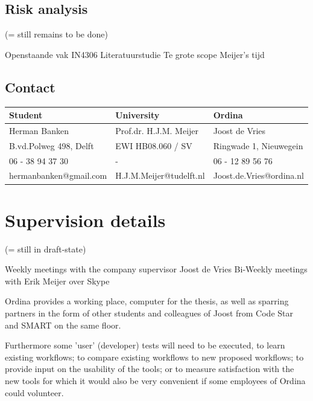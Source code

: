 \documentclass[11pt,a4paper]{article}
\begin{document}
\subsection{Risk analysis}
(= still remains to be done)

Openstaande vak IN4306 Literatuurstudie
Te grote scope
Meijer's tijd

\subsection{Contact}

\begin{table}[h]
\centering
\begin{tabular}{@{}lll@{}}
\textbf{Student}       & \textbf{University}     & \textbf{Ordina}        \\\hline
Herman Banken          & Prof.dr. H.J.M. Meijer  & Joost de Vries         \\
B.vd.Polweg 498, Delft & EWI HB08.060 / SV       & Ringwade 1, Nieuwegein \\
06 - 38 94 37 30       & -                       & 06 - 12 89 56 76       \\ 
hermanbanken@gmail.com & H.J.M.Meijer@tudelft.nl & Joost.de.Vries@ordina.nl
\end{tabular}
\end{table}

\section{Supervision details}
(= still in draft-state)

Weekly meetings with the company supervisor Joost de Vries
Bi-Weekly meetings with Erik Meijer over Skype

Ordina provides a working place, computer for the thesis, as well as sparring partners in the form of other students and colleagues of Joost from Code Star and SMART on the same floor.

Furthermore some 'user' (developer) tests will need to be executed, 
to learn existing workflows;
to compare existing workflows to new proposed workflows;
to provide input on the usability of the tools;
or to measure satisfaction with the new tools
for which it would also be very convenient if some employees of Ordina could volunteer.

{}


%
%
%
%
%
%
\end{document}
